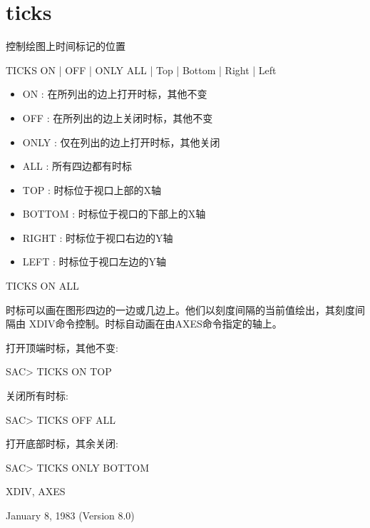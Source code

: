 \section{ticks}
\label{cmd:ticks}

控制绘图上时间标记的位置

TICKS ON | OFF | ONLY  ALL | Top | Bottom | Right | Left

\begin{itemize}
\item ON : 在所列出的边上打开时标，其他不变 
\item OFF : 在所列出的边上关闭时标，其他不变 
\item ONLY : 仅在列出的边上打开时标，其他关闭 
\item ALL : 所有四边都有时标 
\item TOP : 时标位于视口上部的X轴 
\item BOTTOM : 时标位于视口的下部上的X轴 
\item RIGHT : 时标位于视口右边的Y轴 
\item LEFT : 时标位于视口左边的Y轴 
\end{itemize}

TICKS ON ALL

时标可以画在图形四边的一边或几边上。他们以刻度间隔的当前值绘出，其刻度间隔由	XDIV命令控制。时标自动画在由AXES命令指定的轴上。

打开顶端时标，其他不变:
\begin{SACCode}
SAC> TICKS ON TOP
\end{SACCode}

关闭所有时标:
\begin{SACCode}
SAC> TICKS OFF ALL
\end{SACCode}

打开底部时标，其余关闭:
\begin{SACCode}
SAC> TICKS ONLY BOTTOM
\end{SACCode}

XDIV, AXES

January 8, 1983 (Version 8.0)
